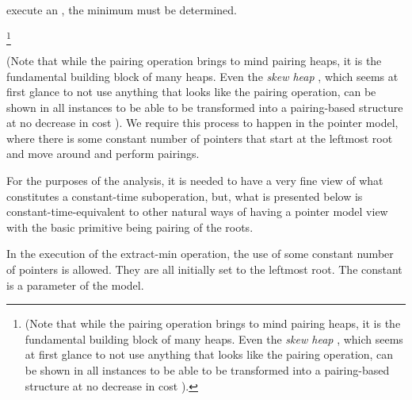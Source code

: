  execute an \opEm, the minimum must be determined. 
\begin{shortonly}
\footnote{(Note that while the pairing operation brings to mind pairing heaps, it is the fundamental building block of many heaps. Even the \emph{skew heap} \cite{DBLP:journals/siamcomp/SleatorT86}, which seems at first glance to not use anything that looks like the pairing operation, can be shown in all instances to be able to be transformed into a pairing-based structure at no decrease in cost \cite{DBLP:conf/wae/Fredman99}).}
\end{shortonly}
\begin{fullonly}
(Note that while the pairing operation brings to mind pairing heaps, it is the fundamental building block of many heaps. Even the \emph{skew heap} \cite{DBLP:journals/siamcomp/SleatorT86}, which seems at first glance to not use anything that looks like the pairing operation, can be shown in all instances to be able to be transformed into a pairing-based structure at no decrease in cost \cite{DBLP:conf/wae/Fredman99}).  We require this process to happen in the pointer model, where there is some constant number of pointers that start at the leftmost root and move around and perform pairings. 

For the purposes of the analysis, it is needed to have a very fine view of what constitutes a constant-time suboperation, but, what is presented below is constant-time-equivalent to other natural ways of having a pointer model view with the basic primitive being pairing of the roots.
\end{fullonly}

In the execution of the extract-min operation, the use of some constant number  of pointers  is allowed. They are all initially set to the leftmost root. The constant  is a parameter of the model. 


